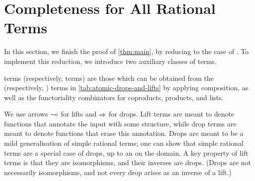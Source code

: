 \section{Completeness for All Rational Terms}
\label{sec:completeness-for-all-rational-terms}
In this section, we finish the proof of \cref{thm:main}, by reducing to the case of . To implement this reduction, we introduce two auxiliary classes of terms.

\begin{definition}
    \label{def:lift-drop}
     terms (respectively,  terms) are those which can be obtained from the  (respectively, ) terms
    in \cref{tab:atomic-drops-and-lifts} by applying composition, as well as the functoriality combinators for  coproducts, products, and lists.
\end{definition}

We use arrows $\multimap$ for lifts and $\Rightarrow$ for drops. 
Lift terms are meant to denote functions that annotate the input with some structure, while drop terms are meant to denote functions that erase this annotation. Drops are meant to be a mild generalisation of simple rational terms; one can show that simple rational terms are a special case of drops, up to an  on the domain. A key property of  lift terms is that they are isomorphisms, and their inverses are drops. (Drops are not necessarily isomorphisms, and not every drop arises as an inverse of a lift.) 


